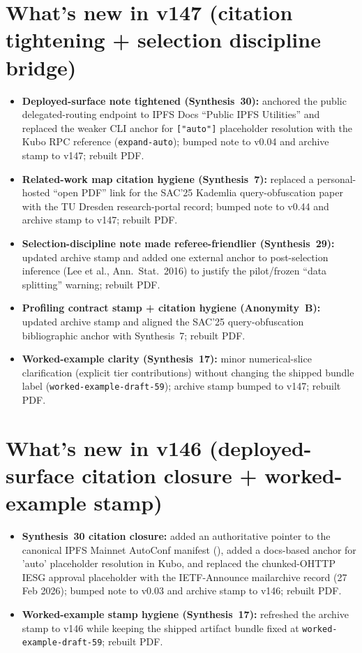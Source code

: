 \documentclass[11pt]{article}
\begin{document}
\section{What's new in v147 (citation tightening + selection discipline bridge)}
\begin{itemize}[leftmargin=*]
\item \textbf{Deployed-surface note tightened (Synthesis~30):} anchored the public delegated-routing endpoint to IPFS Docs ``Public IPFS Utilities'' and replaced the weaker CLI anchor for \texttt{["auto"]} placeholder resolution with the Kubo RPC reference (\texttt{expand-auto}); bumped note to v0.04 and archive stamp to v147; rebuilt PDF.
\item \textbf{Related-work map citation hygiene (Synthesis~7):} replaced a personal-hosted ``open PDF'' link for the SAC'25 Kademlia query-obfuscation paper with the TU Dresden research-portal record; bumped note to v0.44 and archive stamp to v147; rebuilt PDF.
\item \textbf{Selection-discipline note made referee-friendlier (Synthesis~29):} updated archive stamp and added one external anchor to post-selection inference (Lee et al., Ann.\ Stat.\ 2016) to justify the pilot/frozen ``data splitting'' warning; rebuilt PDF.
\item \textbf{Profiling contract stamp + citation hygiene (Anonymity~B):} updated archive stamp and aligned the SAC'25 query-obfuscation bibliographic anchor with Synthesis~7; rebuilt PDF.
\item \textbf{Worked-example clarity (Synthesis~17):} minor numerical-slice clarification (explicit tier contributions) without changing the shipped bundle label (\texttt{worked-example-draft-59}); archive stamp bumped to v147; rebuilt PDF.
\end{itemize}

\section{What's new in v146 (deployed-surface citation closure + worked-example stamp)}
\begin{itemize}[leftmargin=*]
\item \textbf{Synthesis~30 citation closure:} added an authoritative pointer to the canonical IPFS Mainnet AutoConf manifest (), added a docs-based anchor for 'auto' placeholder resolution in Kubo, and replaced the chunked-OHTTP IESG approval placeholder with the IETF-Announce mailarchive record (27 Feb 2026); bumped note to v0.03 and archive stamp to v146; rebuilt PDF.
\item \textbf{Worked-example stamp hygiene (Synthesis~17):} refreshed the archive stamp to v146 while keeping the shipped artifact bundle fixed at \texttt{worked-example-draft-59}; rebuilt PDF.
\end{itemize}
\end{document}
